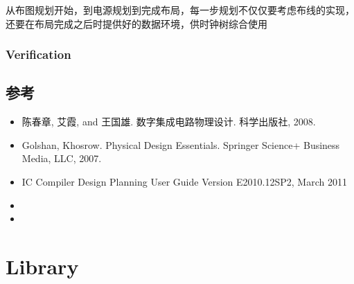 \documentclass[letterpaper,10pt,english]{sphinxmanual}
\begin{document}
\sphinxAtStartPar
从布图规划开始，到电源规划到完成布局，每一步规划不仅仅要考虑布线的实现，还要在布局完成之后时提供好的数据环境，供时钟树综合使用


\subsection{Verification}
\label{\detokenize{chapter1/Design_Flow:verification}}
\sphinxAtStartPar
{}


\section{参考}
\label{\detokenize{chapter1/_u53c2_u8003:id1}}\label{\detokenize{chapter1/_u53c2_u8003::doc}}\begin{itemize}
\item {} 
\sphinxAtStartPar
陈春章, 艾霞, and 王国雄. 数字集成电路物理设计. 科学出版社, 2008.

\item {} 
\sphinxAtStartPar
Golshan, Khosrow. Physical Design Essentials. Springer Science+ Business Media, LLC, 2007.

\item {} 
\sphinxAtStartPar
IC Compiler Design Planning User Guide Version E\sphinxhyphen{}2010.12\sphinxhyphen{}SP2, March 2011

\item {} 
\sphinxAtStartPar
{}

\item {} 
\sphinxAtStartPar
{}

\end{itemize}


\chapter{Library}
\label{\detokenize{chapter2/index:library}}\label{\detokenize{chapter2/index::doc}}
\end{document}

